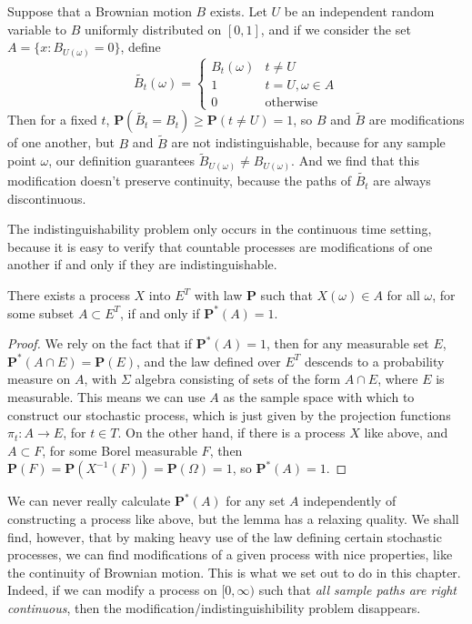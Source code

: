 \begin{example}
    Suppose that a Brownian motion $B$ exists. Let $U$ be an independent random variable to $B$ uniformly distributed on $[0,1]$, and if we consider the set $A = \{ x : B_{U(\omega)} = 0 \}$, define
    \[ \tilde{B_t}(\omega) = \begin{cases} B_t(\omega) & t \neq U \\ 1 & t = U, \omega \in A \\ 0 & \text{otherwise} \end{cases} \]
    Then for a fixed $t$, $\mathbf{P}(\tilde{B_t} = B_t) \geq \mathbf{P}(t \neq U) = 1$, so $B$ and $\tilde{B}$ are modifications of one another, but $B$ and $\tilde{B}$ are not indistinguishable, because for any sample point $\omega$, our definition guarantees $\tilde{B}_{U(\omega)} \neq B_{U(\omega)}$. And we find that this modification doesn't preserve continuity, because the paths of $\tilde{B_t}$ are always discontinuous.
\end{example}

The indistinguishability problem only occurs in the continuous time setting, because it is easy to verify that countable processes are modifications of one another if and only if they are indistinguishable.

\begin{lemma}
    There exists a process $X$ into $E^T$ with law $\mathbf{P}$ such that $X(\omega) \in A$ for all $\omega$, for some subset $A \subset E^T$, if and only if $\mathbf{P}^*(A) = 1$.
\end{lemma}
\begin{proof}
    We rely on the fact that if $\mathbf{P}^*(A) = 1$, then for any measurable set $E$, $\mathbf{P}^*(A \cap E) = \mathbf{P}(E)$, and the law defined over $E^T$ descends to a probability measure on $A$, with $\Sigma$ algebra consisting of sets of the form $A \cap E$, where $E$ is measurable. This means we can use $A$ as the sample space with which to construct our stochastic process, which is just given by the projection functions $\pi_t: A \to E$, for $t \in T$. On the other hand, if there is a process $X$ like above, and $A \subset F$, for some Borel measurable $F$, then $\mathbf{P}(F) = \mathbf{P}(X^{-1}(F)) = \mathbf{P}(\Omega) = 1$, so $\mathbf{P}^*(A) = 1$.
\end{proof}

We can never really calculate $\mathbf{P}^*(A)$ for any set $A$ independently of constructing a process like above, but the lemma has a relaxing quality. We shall find, however, that by making heavy use of the law defining certain stochastic processes, we can find modifications of a given process with nice properties, like the continuity of Brownian motion. This is what we set out to do in this chapter. Indeed, if we can modify a process on $[0,\infty)$ such that {\it all sample paths are right continuous}, then the modification/indistinguishibility problem disappears.

